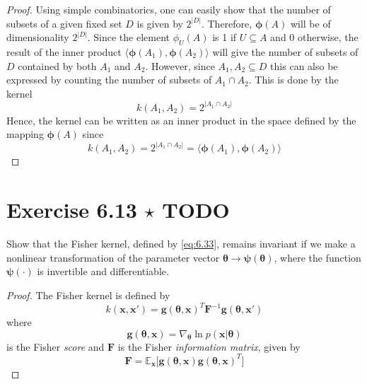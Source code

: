 \begin{proof}
    Using simple combinatorics, one can easily show that the number
    of subsets of a given fixed set $D$ is given by $2^{|D|}$.
    Therefore, $\bm{\phi}(A)$ will be of dimensionality $2^{|D|}$. Since
    the element $\phi_U(A)$ is 1 if $U \subseteq A$ and 0 otherwise,
    the result of the inner product $\langle \bm{\phi}(A_1), \bm{\phi}(A_2) \rangle$
    will give the number of subsets of $D$ contained by both $A_1$ and $A_2$. 
    However, since $A_1, A_2 \subseteq D$ this can also be expressed by counting
    the number of subsets of $A_1 \cap A_2$. This is done by the kernel
    \begin{equation}\label{eq:6.27}\tag{6.27}
        k(A_1, A_2) = 2^{|A_1 \cap A_2|}
    \end{equation}
    Hence, the kernel can be written as an inner product in the space defined
    by the mapping $\bm{\phi}(A)$ since
     \[
        k(A_1, A_2) = 2^{|A_1 \cap A_2|} = \langle \bm{\phi}(A_1), \bm{\phi}(A_2) \rangle
    \] 
\end{proof}

\section*{Exercise 6.13 $\star$ TODO}
Show that the Fisher kernel, defined by \eqref{eq:6.33}, remains
invariant if we make a nonlinear transformation of the parameter
vector $\bm{\theta} \to \bm{\psi}(\bm{\theta})$, where the function
$\bm{\psi}(\cdot)$ is invertible and differentiable.

\vspace{1em}

\begin{proof}
    The Fisher kernel is defined by
    \begin{equation}\label{eq:6.33}\tag{6.33}
        k(\mathbf{x}, \mathbf{x}') 
        = \mathbf{g}(\bm{\theta}, \mathbf{x})^T \mathbf{F}^{-1} \mathbf{g}(\bm{\theta}, \mathbf{x}')
    \end{equation}
    where 
    \begin{equation}\label{eq:6.32}\tag{6.32}
        \mathbf{g}(\bm{\theta}, \mathbf{x}) 
        = \nabla_{\bm{\theta}} \ln p(\mathbf{x} | \bm{\theta})
    \end{equation}
    is the Fisher \emph{score} and $\mathbf{F}$ is the Fisher \emph{information matrix}, given
    by
    \begin{equation}\label{eq:6.34}\tag{6.34}
        \mathbf{F} = \mathbb{E}_\mathbf{x}\big[
        \mathbf{g}(\bm{\theta}, \mathbf{x})\mathbf{g}(\bm{\theta}, \mathbf{x})^T\big]
    \end{equation}
\end{proof}

